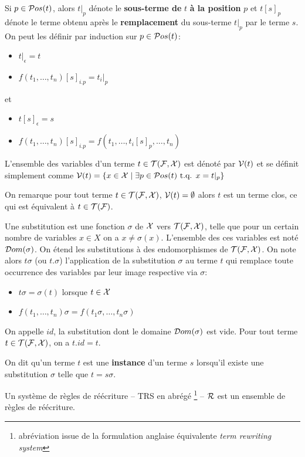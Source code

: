 Si $p \in \mathcal{ P}os(t)$, alors $t|_p$ dénote le \textbf{sous-terme de} $t$ \textbf{à la position} $p$ et
$t[s]_p$ dénote le terme obtenu après le \textbf{remplacement} du sous-terme $t|_p$ par le terme $s$.
On peut les définir par induction sur $p \in \mathcal{ P}os(t)$:
\begin{itemize}
\item $t|_\epsilon = t$
\item $f(t_1,\dots, t_n)[s]_{i.p} = t_i|_p$
\end{itemize}
et
\begin{itemize}
\item $t[s]_\epsilon = s$
\item $f(t_1,\dots, t_n)[s]_{i.p} = f(t_1,\dots, t_i[s]_p,\dots,t_n)$
\end{itemize}

\begin{definition}
  L'ensemble des variables d'un terme $t \in \mathcal{T(F, X)}$ est dénoté par $\mathcal V(t)$ et se définit simplement
  comme $\mathcal V(t) = \{ x \in \mathcal X \; | \; \exists p \in \mathcal{ P}os(t) \mbox{ t.q. } x = t|_p\}$
\end{definition}
On remarque pour tout terme $t \in \mathcal{T(F, X)}$, $\mathcal V(t) = \emptyset$ alors $t$ est un terme clos, ce qui est équivalent à $t \in \mathcal{T(F)}$.

\begin{definition}
  Une substitution est une fonction $\sigma$ de $\mathcal X$ vers $\mathcal{T(F, X)}$, telle que 
  pour un certain nombre de variables $x \in X$ on a $x \not= \sigma(x)$.
  L'ensemble des ces variables est noté $\mathcal{D}om(\sigma)$.
  On étend les substitutions à des endomorphismes de $\mathcal{T(F, X)}$. 
  On note alors $t\sigma$ (ou $t.\sigma$) l'application de la substitution $\sigma$ au terme $t$ 
  qui remplace toute occurrence des variables par leur image respective via $\sigma$:
  \begin{itemize}
  \item $t\sigma = \sigma(t)$ lorsque $t \in \mathcal X$
  \item $f(t_1, \dots, t_n)\sigma = f(t_1\sigma, \dots, t_n\sigma)$
  \end{itemize}
\end{definition}
On appelle $id$, la substitution dont le domaine $\mathcal{D}om(\sigma)$ est vide.
Pour tout terme $t \in \mathcal{T(F, X)}$, on a $t.id = t$.

On dit qu'un terme $t$ est une \textbf{instance} d'un terme $s$ lorsqu'il existe une substitution
$\sigma$ telle que $t = s\sigma$.

Un système de règles de réécriture -- TRS en abrégé
\footnote{\footnotesize abréviation issue de la formulation anglaise équivalente {\em term rewriting system}} -- 
$\mathcal R$ est un ensemble de règles de réécriture. 

